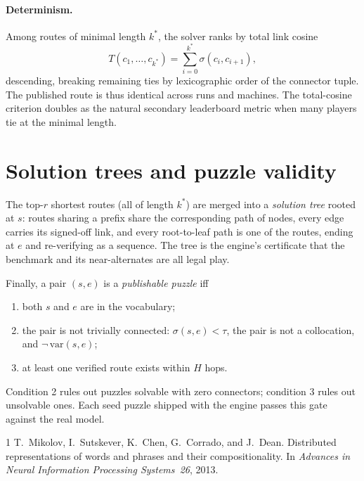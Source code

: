 \documentclass[11pt]{article}
\newcommand{\cosim}{\sigma}
\newcommand{\thresh}{\tau}
\begin{document}
\paragraph{Determinism.}
Among routes of minimal length $k^\ast$, the solver ranks by total link cosine
\[
  T(c_1, \dots, c_{k^\ast})
  = \sum_{i=0}^{k^\ast} \cosim(c_i, c_{i+1}),
\]
descending, breaking remaining ties by lexicographic order of the connector
tuple. The published route is thus identical across runs and machines. The
total-cosine criterion doubles as the natural secondary leaderboard metric
when many players tie at the minimal length.

\section{Solution trees and puzzle validity}

The top-$r$ shortest routes (all of length $k^\ast$) are merged into a
\emph{solution tree} rooted at $s$: routes sharing a prefix share the
corresponding path of nodes, every edge carries its signed-off link, and every
root-to-leaf path is one of the routes, ending at $e$ and re-verifying as a
sequence. The tree is the engine's certificate that the benchmark and its
near-alternates are all legal play.

Finally, a pair $(s, e)$ is a \emph{publishable puzzle} iff
\begin{enumerate}
  \item both $s$ and $e$ are in the vocabulary;
  \item the pair is not trivially connected: $\cosim(s, e) < \thresh$, the
        pair is not a collocation, and $\neg\,\mathrm{var}(s, e)$;
  \item at least one verified route exists within $H$ hops.
\end{enumerate}
Condition 2 rules out puzzles solvable with zero connectors; condition 3 rules
out unsolvable ones. Each seed puzzle shipped with the engine passes this
gate against the real model.

\begin{thebibliography}{1}
T.~Mikolov, I.~Sutskever, K.~Chen, G.~Corrado, and J.~Dean.
\newblock Distributed representations of words and phrases and their
  compositionality.
\newblock In \emph{Advances in Neural Information Processing Systems~26},
  2013.
\end{thebibliography}
\end{document}
